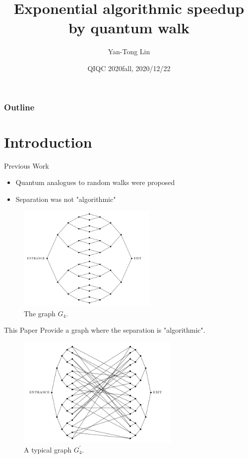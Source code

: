 \documentclass{beamer}
\title{Exponential algorithmic speedup by quantum walk}
\author{Yan-Tong Lin}
\institute{National Chiao Tung University}
\date{QIQC 2020fall, 2020/12/22}
\newcommand{\<}{\langle}
\renewcommand{\>}{\rangle}
\begin{document}

\frame{\titlepage}


\begin{frame}
\frametitle{Outline}
\setcounter{tocdepth}{1}
\tableofcontents
\end{frame}


\section{Introduction} \label{sec:intro}

\begin{frame}{Previous Work}
    \begin{itemize}
        \item Quantum analogues to random walks were proposed 
        \item Separation was not "algorithmic"
    \end{itemize}
    \begin{figure}
        \includegraphics[width=0.6\textwidth]{basicgraph4.png}
        \caption{The graph $G_4$.}
        \label{fig:graph}
    \end{figure}
\end{frame}

\begin{frame}{This Paper}
Provide a graph where the separation is "algorithmic".
    \begin{figure}
        \includegraphics[width=0.7\textwidth]{graph4.png}
        \caption{A typical graph $G^{\prime}_4$.}
        \label{fig:graphprime}
    \end{figure}
\end{frame}
\end{document}
